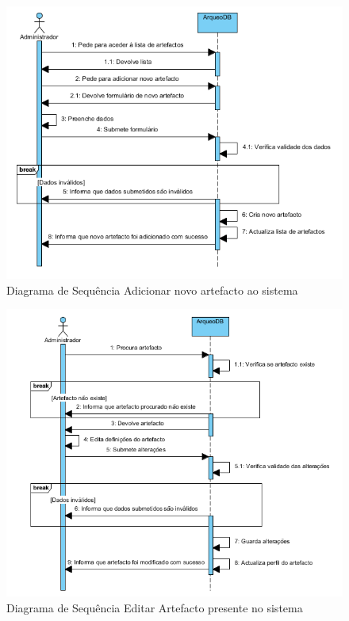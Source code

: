 ﻿\documentclass[12pt,a4paper]{article}
\begin{document}
\begin{figure}[h!]
\centering
\includegraphics[scale=1]{sequencia/A_criarartefacto}
\caption{Diagrama de Sequência Adicionar novo artefacto ao sistema} 
\end{figure}  

\begin{figure}[h!]
\centering
\includegraphics[scale=1]{sequencia/A_editarartefacto}
\caption{Diagrama de Sequência Editar Artefacto presente no sistema} 
\end{figure}  
\end{document}
